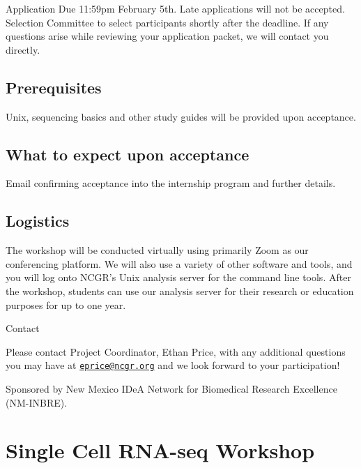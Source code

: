 \documentclass[
]{book}
\begin{document}
Application Due 11:59pm February 5th. Late applications will not be accepted. Selection Committee to select participants shortly after the deadline. If any questions arise while reviewing your application packet, we will contact you directly.

\hypertarget{prerequisites-1}{%
\section*{Prerequisites}\label{prerequisites-1}}

Unix, sequencing basics and other study guides will be provided upon acceptance.

\hypertarget{what-to-expect-upon-acceptance-1}{%
\section*{What to expect upon acceptance}\label{what-to-expect-upon-acceptance-1}}

Email confirming acceptance into the internship program and further details.

\hypertarget{logistics-1}{%
\section*{Logistics}\label{logistics-1}}

The workshop will be conducted virtually using primarily Zoom as our conferencing platform. We will also use a variety of other software and tools, and you will log onto NCGR's Unix analysis server for the command line tools. After the workshop, students can use our analysis server for their research or education purposes for up to one year.

Contact

Please contact Project Coordinator, Ethan Price, with any additional questions you may have at \href{mailto:eprice@ncgr.org}{\nolinkurl{eprice@ncgr.org}} and we look forward to your participation!

Sponsored by New Mexico IDeA Network for Biomedical Research Excellence (NM-INBRE).

\hypertarget{single-cell-rna-seq-workshop}{%
\chapter*{Single Cell RNA-seq Workshop}\label{single-cell-rna-seq-workshop}}
\end{document}
